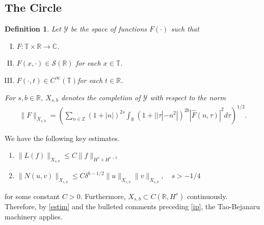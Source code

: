 \documentclass{amsart}
\newtheorem{definition}[theorem]{Definition}
\newcommand{\rr}{\mathbb{R}}
\newcommand{\zz}{\mathbb{Z}}
\newcommand{\cc}{\mathbb{C}}
\newcommand{\ci}{\mathbb{T}}
\newcommand{\wh}{\widehat}
\begin{document}
\subsection{The Circle} 
%
%
\begin{definition}
  Let $\mathcal{Y}$ be the space of functions $F(\cdot)$ such that
  \begin{enumerate}[(I)]
   \item{$F: \ci \times \rr \to \cc$}.
   \item{$F(x, \cdot) \in \mathcal{S}(\rr)$ for each $x \in \ci$}.
   \item{$F(\cdot, t) \in C^{\infty}(\ci)$for each $t \in \rr$}.
  \end{enumerate}
  For $s, b \in \rr$, $X_{s,b}$ denotes the completion of $\mathcal{Y}$ with
  respect to the norm
  \begin{equation}
  \begin{split}
    \|F\|_{X_{s,b}} = \left( \sum_{n \in \zz} (1 + |n|)^{2s} \int_{\rr}
    (1 + | | \tau | - n^{2} |)^{2b} |\wh{F}(n, \tau)|^{2} d \tau\right)^{1/2}.
  \end{split}
  \label{eqn:bous-norm}
  \end{equation}
\end{definition}
%
We have the following key estimates.
\begin{enumerate}
  \item{$\|L(f)\|_{X_{s,b}} \le C \| f \|_{H^s \times H^{s-2}}$}
  \item{$\| N(u, v) \|_{X_{s,b}} \le C \delta^{b - 1/2} \| u \|_{X_{s,b}} \| v \|_{X_{s,b}}, \quad s > -1/4$} 
\end{enumerate}
for some constant $C > 0$.
%
Furthermore, $X_{s,b} \subset C(\rr, H^{s})$
continuously. Therefore, by \eqref{estim} and the bulleted comments preceding
\eqref{ip}, the Tao-Bejanaru machinery applies.
%
%
%
%
%
\end{document}
